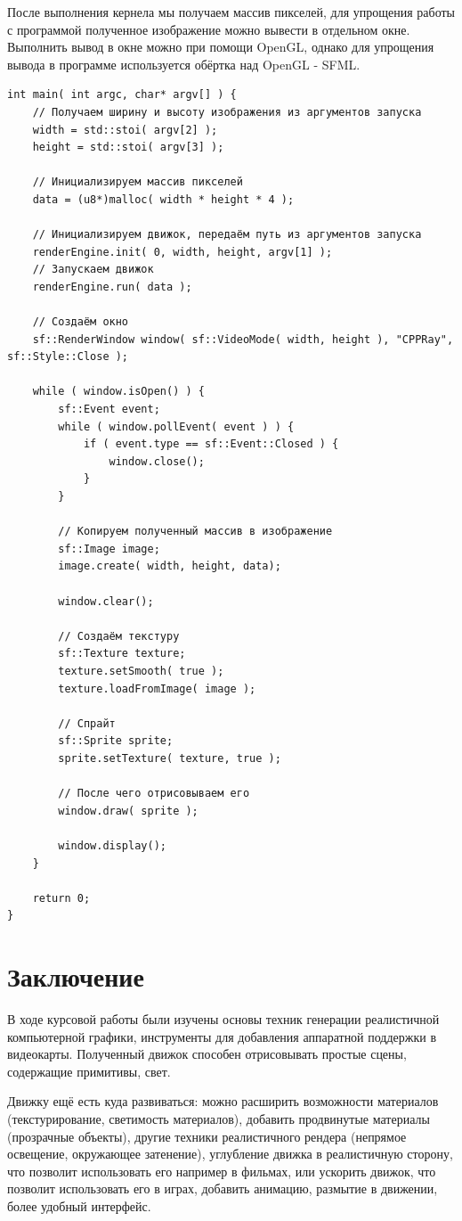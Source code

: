 \documentclass[a4paper,14pt]{extarticle}
\begin{document}
После выполнения кернела мы получаем массив пикселей, для упрощения работы с программой полученное изображение можно вывести в отдельном окне.
Выполнить вывод в окне можно при помощи OpenGL, однако для упрощения вывода в программе используется обёртка над OpenGL - SFML.
\begin{verbatim}
int main( int argc, char* argv[] ) {
    // Получаем ширину и высоту изображения из аргументов запуска
    width = std::stoi( argv[2] );
	height = std::stoi( argv[3] );

    // Инициализируем массив пикселей
	data = (u8*)malloc( width * height * 4 );
	
    // Инициализируем движок, передаём путь из аргументов запуска
    renderEngine.init( 0, width, height, argv[1] );
    // Запускаем движок
	renderEngine.run( data );

    // Создаём окно
	sf::RenderWindow window( sf::VideoMode( width, height ), "CPPRay", sf::Style::Close );

	while ( window.isOpen() ) {
		sf::Event event;
		while ( window.pollEvent( event ) ) {
			if ( event.type == sf::Event::Closed ) {
				window.close();
			}
		}

        // Копируем полученный массив в изображение 
		sf::Image image;
		image.create( width, height, data);

		window.clear();

        // Создаём текстуру
		sf::Texture texture;
		texture.setSmooth( true );
		texture.loadFromImage( image );

        // Спрайт
		sf::Sprite sprite;
		sprite.setTexture( texture, true );

        // После чего отрисовываем его
		window.draw( sprite );

		window.display();
	}

	return 0;
}
\end{verbatim}


\section{Заключение}

В ходе курсовой работы были изучены основы техник генерации реалистичной компьютерной графики, 
инструменты для добавления аппаратной поддержки в видеокарты.
Полученный движок способен отрисовывать простые сцены, содержащие примитивы, свет.

Движку ещё есть куда развиваться: можно расширить возможности материалов (текстурирование, светимость материалов), 
добавить продвинутые материалы (прозрачные объекты), 
другие техники реалистичного рендера (непрямое освещение, окружающее затенение), 
углубление движка в реалистичную сторону, что позволит использовать его например в фильмах, 
или ускорить движок, что позволит использовать его в играх, 
добавить анимацию, размытие в движении, более удобный интерфейс.
\end{document}
